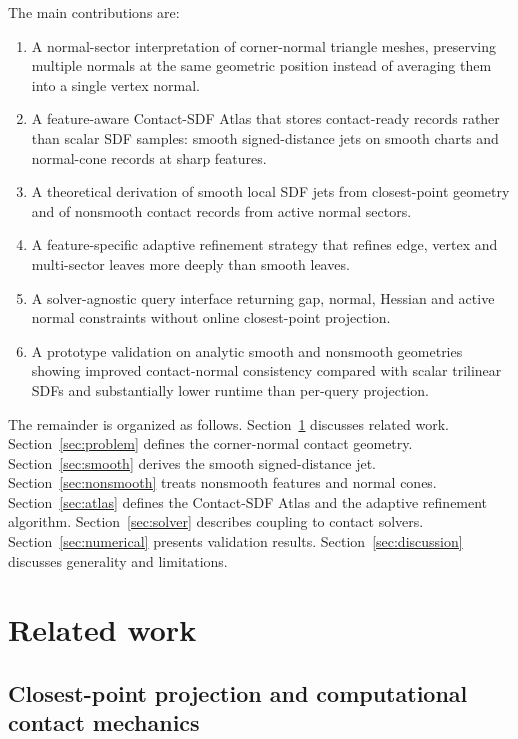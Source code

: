 \documentclass[preprint,12pt,sort&compress]{elsarticle}
\begin{document}
The main contributions are:
\begin{enumerate}[label=(\arabic*), leftmargin=1.8em]
\item A normal-sector interpretation of corner-normal triangle meshes, preserving multiple normals at the same geometric position instead of averaging them into a single vertex normal.
\item A feature-aware Contact-SDF Atlas that stores contact-ready records rather than scalar SDF samples: smooth signed-distance jets on smooth charts and normal-cone records at sharp features.
\item A theoretical derivation of smooth local SDF jets from closest-point geometry and of nonsmooth contact records from active normal sectors.
\item A feature-specific adaptive refinement strategy that refines edge, vertex and multi-sector leaves more deeply than smooth leaves.
\item A solver-agnostic query interface returning gap, normal, Hessian and active normal constraints without online closest-point projection.
\item A prototype validation on analytic smooth and nonsmooth geometries showing improved contact-normal consistency compared with scalar trilinear SDFs and substantially lower runtime than per-query projection.
\end{enumerate}

The remainder is organized as follows. Section~\ref{sec:related} discusses related work. Section~\ref{sec:problem} defines the corner-normal contact geometry. Section~\ref{sec:smooth} derives the smooth signed-distance jet. Section~\ref{sec:nonsmooth} treats nonsmooth features and normal cones. Section~\ref{sec:atlas} defines the Contact-SDF Atlas and the adaptive refinement algorithm. Section~\ref{sec:solver} describes coupling to contact solvers. Section~\ref{sec:numerical} presents validation results. Section~\ref{sec:discussion} discusses generality and limitations.

\section{Related work}
\label{sec:related}

\subsection{Closest-point projection and computational contact mechanics}
\end{document}
